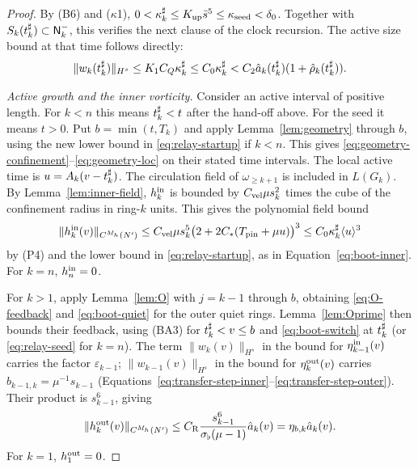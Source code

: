\begin{proof}
By (B6) and ($\kappa$1), $0<\kappa^\sharp_k\le K_{\mathrm{up}}\bar s^5\le\kappa_{\mathrm{seed}}<\delta_0$.
Together with $S_k(t^\sharp_k)\subset\mathsf{N}^{-}_k$, this verifies the next clause of
the clock recursion. The active size bound at that time follows directly:
\begin{equation}
\label{eq:boot-switch}
\|w_k(t^\sharp_k)\|_{H^s}\le K_1C_Q\kappa^\sharp_k\le C_0\kappa^\sharp_k
<C_2\hat a_k(t^\sharp_k)(1+\hat\rho_k(t^\sharp_k)).
\end{equation}

\label{par:relay-active}
\emph{Active growth and the inner vorticity.}
Consider an active interval of positive length. For $k<n$ this means
$t^\sharp_k<t$ after the hand-off above. For the seed it means $t>0$. Put
$b=\min(t,T_k)$ and apply Lemma~\ref{lem:geometry} through $b$,
using the new lower bound in \eqref{eq:relay-startup} if $k<n$.
This gives \eqref{eq:geometry-confinement}--\eqref{eq:geometry-loc}
on their stated time intervals. The local active time
is $u=A_k(v-t^\sharp_k)$. The circulation field of $\omega_{\ge k+1}$ is
included in $L(G_k)$. By Lemma~\ref{lem:inner-field}, $h^{\mathrm{in}}_k$ is
bounded by $C_{\mathrm{vel}}\mu s_k^2$ times the cube of the
confinement radius in ring-$k$ units. This gives the polynomial field
bound
\begin{equation}
\label{eq:relay-inner-calculation}
\|h^{\mathrm{in}}_k(v)\|_{C^{M_h}(N')}
\le C_{\mathrm{vel}}\mu s_k^5\big(2+2C_{*}(T_{\mathrm{pin}}+\mu u)\big)^3
\le C_0\kappa^\sharp_k\langle u\rangle^3
\end{equation}
by (P4) and the lower bound in \eqref{eq:relay-startup}, as in
Equation~\eqref{eq:boot-inner}.
For $k=n$, $h^{\mathrm{in}}_n=0$.

For $k>1$, apply Lemma~\ref{lem:O} with $j=k-1$ through $b$, obtaining
\eqref{eq:O-feedback} and \eqref{eq:boot-quiet} for the outer quiet rings.
Lemma~\ref{lem:Oprime} then bounds their feedback, using (BA3) for
$t^\sharp_k<v\le b$ and \eqref{eq:boot-switch} at $t^\sharp_k$ (or
\eqref{eq:relay-seed} for $k=n$). The term $\|w_k(v)\|_{H^s}$ in the
bound for $\eta^{\mathrm{in}}_{k-1}(v)$ carries the factor $\varepsilon_{k-1}$;
$\|w_{k-1}(v)\|_{H^s}$ in the bound for $\eta^{\mathrm{out}}_k(v)$ carries
$b_{k-1,k}=\mu^{-1}s_{k-1}$
(Equations~\eqref{eq:transfer-step-inner}--\eqref{eq:transfer-step-outer}).
Their product is $s_{k-1}^6$, giving
\begin{equation}
\label{eq:relay-outer-field}
\|h^{\mathrm{out}}_k(v)\|_{C^{M_h}(N')}
\le C_{\mathrm R}\frac{s_{k-1}^6}{\sigma_\flat(\mu-1)}\hat a_k(v)
=\eta_{b,k}\hat a_k(v).
\end{equation}
For $k=1$, $h^{\mathrm{out}}_1=0$.


\end{proof}
